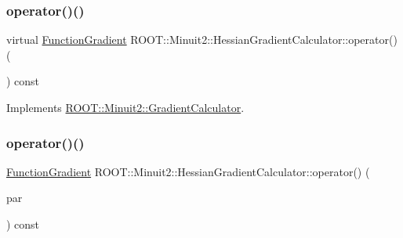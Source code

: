 \mbox{\label{classROOT_1_1Minuit2_1_1HessianGradientCalculator_af65e43d99c763df00e3d082d59a7a24d}} 
\subsubsection{\texorpdfstring{operator()()}{operator()()}\hspace{0.1cm}{\footnotesize\ttfamily [1/4]}}
{\footnotesize\ttfamily virtual \mbox{\hyperlink{classROOT_1_1Minuit2_1_1FunctionGradient}{Function\+Gradient}} R\+O\+O\+T\+::\+Minuit2\+::\+Hessian\+Gradient\+Calculator\+::operator() (\begin{DoxyParamCaption}\item[{const \mbox{\hyperlink{classROOT_1_1Minuit2_1_1MinimumParameters}{Minimum\+Parameters}} \&}]{ }\end{DoxyParamCaption}) const\hspace{0.3cm}{\ttfamily [virtual]}}



Implements \mbox{\hyperlink{classROOT_1_1Minuit2_1_1GradientCalculator_a1bae913e96ffc9ece28664a5f6f79cb0}{R\+O\+O\+T\+::\+Minuit2\+::\+Gradient\+Calculator}}.

\mbox{\label{classROOT_1_1Minuit2_1_1HessianGradientCalculator_ada968380aae7c1c6b6d0716d6a9804b5}} 
\subsubsection{\texorpdfstring{operator()()}{operator()()}\hspace{0.1cm}{\footnotesize\ttfamily [2/4]}}
{\footnotesize\ttfamily \mbox{\hyperlink{classROOT_1_1Minuit2_1_1FunctionGradient}{Function\+Gradient}} R\+O\+O\+T\+::\+Minuit2\+::\+Hessian\+Gradient\+Calculator\+::operator() (\begin{DoxyParamCaption}\item[{const \mbox{\hyperlink{classROOT_1_1Minuit2_1_1MinimumParameters}{Minimum\+Parameters}} \&}]{par }\end{DoxyParamCaption}) const\hspace{0.3cm}{\ttfamily [virtual]}}



